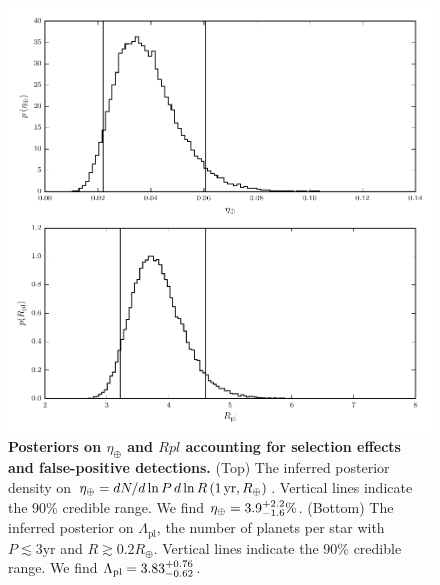 \documentclass{nature}
\newcommand{\etaearth}{\eta_\oplus}
\newcommand{\REarth}{R_\oplus}
\newcommand{\Rpl}{\Lambda_\mathrm{pl}}
\begin{document}
\begin{figure}
  \includegraphics[width=\columnwidth]{pars}
  \caption{\label{fig:eta-earth} \textbf{Posteriors on $\etaearth$ and
      $Rpl$ accounting for selection effects and false-positive
      detections.}  (Top) The inferred posterior density on $\etaearth
    = dN/d\ln P \, d\ln R \left( 1\, \textnormal{yr}, R_\oplus
    \right)$.  Vertical lines indicate the 90\% credible range.  We
    find $\etaearth = \earange$.  (Bottom) The inferred posterior on
    $\Rpl$, the number of planets per star with $P \lesssim 3
    \mathrm{yr}$ and $R \gtrsim 0.2 \REarth$.  Vertical lines indicate
    the 90\% credible range.  We find $\Rpl = \rplrange$.}
\end{figure}
\end{document}
